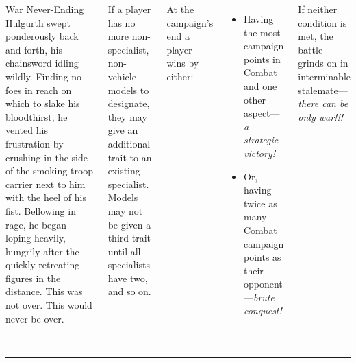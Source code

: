 \begin{columns}
\columnbreak

\begin{sidestory}{0.85in}{War Never-Ending}%
  Hulgurth swept ponderously back and forth, his chainsword idling
  wildly.  Finding no foes in reach on which to slake his bloodthirst,
  he vented his frustration by crushing in the side of the smoking
  troop carrier next to him with the heel of his fist.  Bellowing in
  rage, he began loping heavily, hungrily after the quickly retreating
  figures in the distance.  This was not over.  This would never be
  over.
\end{sidestory}

If a player has no more non-specialist, non-vehicle models to
designate, they may give an additional trait to an existing
specialist.  Models may not be given a third trait until all
specialists have two, and so on.


%

At the campaign's end a player wins by either:

\vspace*{-4pt}
\begin{itemize}
\item Having the most campaign points in Combat and one other
  aspect---\emph{a strategic victory!}

\vspace*{-4pt}
\item Or, having twice as many Combat campaign points as their
  opponent---\emph{brute conquest!}
\end{itemize}
\vspace*{-4pt}

If neither condition is met, the battle grinds on in interminable
stalemate---\emph{there can be only war!!!}


\end{columns}%

\vfill
\hrule
\smallskip
\hrule

